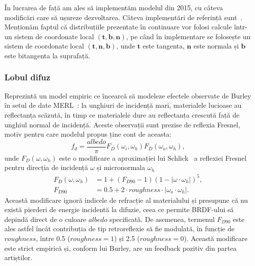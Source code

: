 \documentclass[12pt,a4paper]{report}
\numberwithin{equation}{section} %
\begin{document}
În lucrarea de față am ales să implementăm modelul din 2015, cu câteva modificări
care să ușureze dezvoltarea. Câteva implementări de referință sunt~\cite{DisneyHomework,DisneySchutte,GlslPathTracer}.
Menționăm faptul că distribuțiile prezentate în continuare vor folosi calcule
într-un sistem de coordonate local $(\mathbf{t}, \mathbf{b}, \mathbf{n})$,
pe când în implementare se folosește un sistem de coordonate local $(\mathbf{t}, \mathbf{n}, \mathbf{b})$,
unde $\mathbf{t}$ este tangenta, $\mathbf{n}$ este normala și $\mathbf{b}$ este bitangenta la suprafață.

\subsubsection*{Lobul difuz}
Reprezintă un model empiric ce încearcă să modeleze efectele
observate de Burley în setul de date MERL~\cite{MERL}: la unghiuri de incidență
mari, materialele lucioase au reflectanța scăzută, în timp ce materialele
dure au reflectanța crescută față de unghiul normal de incidență. Aceste
observații sunt prezise de reflexia Fresnel, motiv pentru care modelul propus
ține cont de aceasta:
\begin{equation}\label{eq:brdf_diffuse}
	f_d = \dfrac{albedo}{\pi}F_D(\omega_i, \omega_h)F_D(\omega_o, \omega_h),
\end{equation}
unde $F_D(\omega, \omega_h)$ este o modificare a aproximației lui Schlick~\cite{Schlick} a
reflexiei Fresnel pentru direcția de incidență $\omega$ și micronormala $\omega_h$
\begin{equation}
	\begin{aligned}\label{eq:f_d}
		F_D(\omega, \omega_h) & = 1 + (F_{D90} - 1)(1 - |\omega \cdot \omega_h|)^5,      \\
		F_{D90}               & = 0.5 + 2\cdot roughness\cdot |\omega_o \cdot \omega_h|.
	\end{aligned}
\end{equation}
Această modificare ignoră indicele de refracție al materialului și presupune
că nu există pierderi de energie incidentă la difuzie, ceea ce permite
BRDF-ului să depindă direct de o culoare $albedo$ specificată. De asemenea, termenul $F_{D90}$ este
ales astfel încât contribuția de tip retroreflexie să fie modulată, în funcție
de $roughness$, între 0.5 ($roughness = 1$) și 2.5 ($roughness = 0$). Această
modificare este strict empirică și, conform lui Burley, are un feedback pozitiv
din partea artiștilor.
\end{document}
